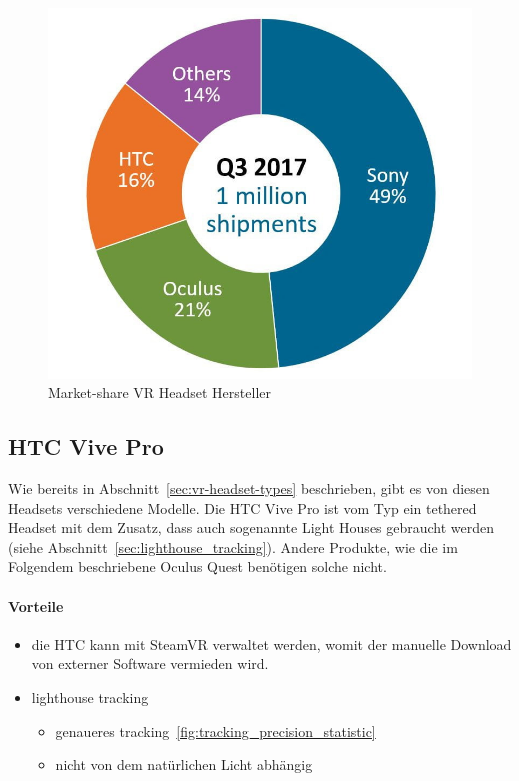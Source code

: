 \begin{figure}
    \centering
    \includegraphics[scale=0.25]{pics/vr_headset_manufacturer_marketshare}
    \caption{Market-share VR Headset Hersteller~\cite{MARTINDALE_2017}}
    \label{fig:vr_headset_manufacturer_marketshare}
\end{figure}

\subsection{HTC Vive Pro}\label{sec:htc-vive}

Wie bereits in Abschnitt~\ref{sec:vr-headset-types} beschrieben, gibt es von diesen Headsets verschiedene Modelle.
Die HTC Vive Pro ist vom Typ ein tethered Headset mit dem Zusatz, dass auch sogenannte Light Houses gebraucht werden (siehe Abschnitt~\ref{sec:lighthouse_tracking}).
Andere Produkte, wie die im Folgendem beschriebene Oculus Quest benötigen solche nicht.

\paragraph{Vorteile}

\begin{itemize}
    \item die HTC kann mit SteamVR verwaltet werden, womit der manuelle Download von externer Software vermieden wird.
    \item lighthouse tracking
    \begin{itemize}
        \item genaueres tracking~\ref{fig:tracking_precision_statistic}
        \item nicht von dem natürlichen Licht abhängig~\cite{Dennis_Ziesecke_2019}
    \end{itemize}
\end{itemize}

